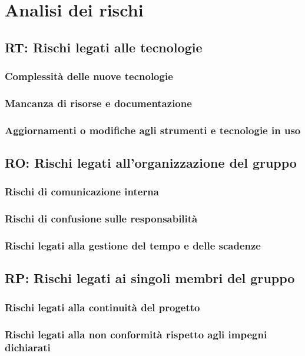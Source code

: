 
 
\section{Analisi dei rischi}
\subsection{RT: Rischi legati alle tecnologie}
\subsubsection{Complessità delle nuove tecnologie}
\subsubsection{Mancanza di risorse e documentazione}
\subsubsection{Aggiornamenti o modifiche agli strumenti e tecnologie in uso}
\subsection{RO: Rischi legati all'organizzazione del gruppo}
\subsubsection{Rischi di comunicazione interna}
\subsubsection{Rischi di confusione sulle responsabilità}
\subsubsection{Rischi legati alla gestione del tempo e delle scadenze}
\subsection{RP: Rischi legati ai singoli membri del gruppo}
\subsubsection{Rischi legati alla continuità del progetto}
\subsubsection{Rischi legati alla non conformità rispetto agli impegni dichiarati}